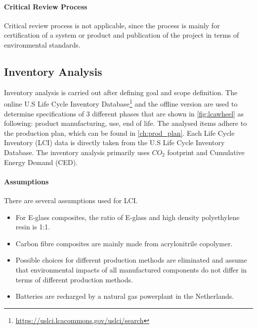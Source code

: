 \paragraph{Critical Review Process}
Critical review process is not applicable, since the process is mainly for certification of a system or product and publication of the project in terms of environmental standards.

\subsection{Inventory Analysis} 
Inventory analysis is carried out after defining goal and scope definition. The online U.S Life Cycle Inventory Database\footnote{\url{https://uslci.lcacommons.gov/uslci/search}} and the offline version \cite{USLCI} are used to determine specifications of 3 different phases that are shown in \autoref{fig:lcawheel} as following: product manufacturing, use, end of life. The analysed items adhere to the production plan, which can be found in \autoref{ch:prod_plan}. Each Life Cycle Inventory (LCI) data is directly taken from the U.S Life Cycle Inventory Database. The inventory analysis primarily uses $CO_{2}$ footprint and Cumulative Energy Demand (CED).


\paragraph{Assumptions} There are several assumptions used for LCI.
\begin{itemize}
    \item For E-glass composites, the ratio of E-glass and high density polyethylene resin is 1:1.
    \item Carbon fibre composites are mainly made from acrylonitrile copolymer.
    \item Possible choices for different production methods are eliminated and assume that environmental impacts of all manufactured components do not differ in terms of different production methods.
    \item Batteries are recharged by a natural gas powerplant in the Netherlands.
\end{itemize}


